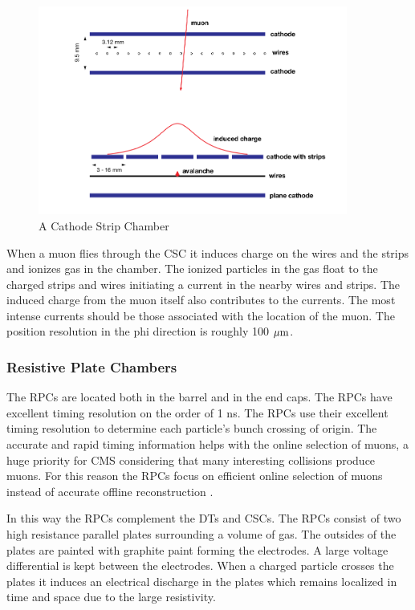\begin{figure}[h!]
  \centering
  \includegraphics[width=4in]{images/CSC.png}
  \caption
   {A Cathode Strip Chamber \cite{mutdr}}
  \label{fig:csc}
\end{figure}

When a muon flies through the CSC it induces charge on the wires and the strips and ionizes gas in the chamber. The ionized particles in the gas float to the charged strips and wires initiating a current in the nearby wires and strips. The induced charge from the muon itself also contributes to the currents. The most intense currents should be those associated with the location of the muon. The position resolution in the phi direction is roughly 100 ${\rm \mu m}$.

\subsubsection{Resistive Plate Chambers}

The RPCs are located both in the barrel and in the end caps. The RPCs have excellent timing resolution on the order of 1 ns. The RPCs use their excellent timing resolution to determine each particle's bunch crossing of origin. The accurate and rapid timing information helps with the online selection of muons, a huge priority for CMS considering that many interesting collisions produce muons. For this reason the RPCs focus on efficient online selection of muons instead of accurate offline reconstruction \cite{cmsexp}.

In this way the RPCs complement the DTs and CSCs. The RPCs consist of two high resistance parallel plates surrounding a volume of gas. The outsides of the plates are painted with graphite paint forming the electrodes. A large voltage differential is kept between the electrodes. When a charged particle crosses the plates it induces an electrical discharge in the plates which remains localized in time and space due to the large resistivity.

